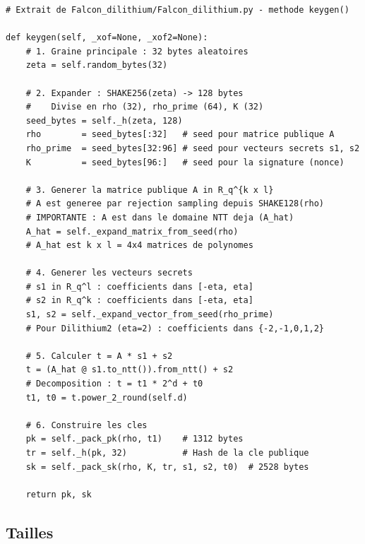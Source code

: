 \documentclass[12pt, a4paper]{article}
\begin{document}
\begin{lstlisting}[style=python]
# Extrait de Falcon_dilithium/Falcon_dilithium.py - methode keygen()

def keygen(self, _xof=None, _xof2=None):
    # 1. Graine principale : 32 bytes aleatoires
    zeta = self.random_bytes(32)

    # 2. Expander : SHAKE256(zeta) -> 128 bytes
    #    Divise en rho (32), rho_prime (64), K (32)
    seed_bytes = self._h(zeta, 128)
    rho        = seed_bytes[:32]   # seed pour matrice publique A
    rho_prime  = seed_bytes[32:96] # seed pour vecteurs secrets s1, s2
    K          = seed_bytes[96:]   # seed pour la signature (nonce)

    # 3. Generer la matrice publique A in R_q^{k x l}
    # A est generee par rejection sampling depuis SHAKE128(rho)
    # IMPORTANTE : A est dans le domaine NTT deja (A_hat)
    A_hat = self._expand_matrix_from_seed(rho)
    # A_hat est k x l = 4x4 matrices de polynomes

    # 4. Generer les vecteurs secrets
    # s1 in R_q^l : coefficients dans [-eta, eta]
    # s2 in R_q^k : coefficients dans [-eta, eta]
    s1, s2 = self._expand_vector_from_seed(rho_prime)
    # Pour Dilithium2 (eta=2) : coefficients dans {-2,-1,0,1,2}

    # 5. Calculer t = A * s1 + s2
    t = (A_hat @ s1.to_ntt()).from_ntt() + s2
    # Decomposition : t = t1 * 2^d + t0
    t1, t0 = t.power_2_round(self.d)

    # 6. Construire les cles
    pk = self._pack_pk(rho, t1)    # 1312 bytes
    tr = self._h(pk, 32)           # Hash de la cle publique
    sk = self._pack_sk(rho, K, tr, s1, s2, t0)  # 2528 bytes

    return pk, sk
\end{lstlisting}

\subsection{Tailles}
\end{document}
